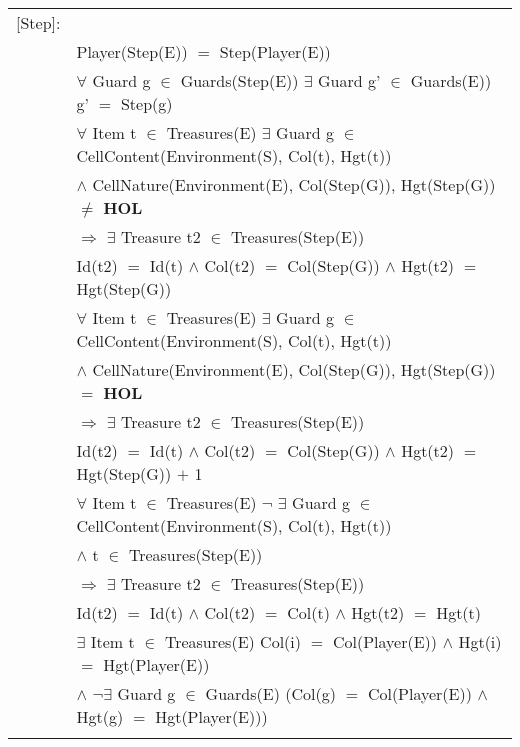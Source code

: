 \documentclass[8pt]{article}
\begin{document}
{\begin{longtable}{rl}
  \textrm{[Step]}:&\\
  & \textrm{Player(Step(E))} $=$ \textrm{Step(Player(E))}\\
  & $\forall$ \textrm{Guard} g $\in$ \textrm{Guards(Step(E))} $\exists$ \textrm{Guard} g' $\in$ \textrm{Guards(E))} g' $=$ \textrm{Step(g)}\\
  & $\forall$ \textrm{Item} t $\in$ \textrm{Treasures(E)} $\exists$ \textrm{Guard} g $\in$ \textrm{CellContent(Environment(S), Col(t), Hgt(t))}\\
  & \quad\quad $\land$ \textrm{CellNature(Environment(E), Col(Step(G)), Hgt(Step(G))} $\ne$ \textbf{HOL}\\
  & \quad\quad $\Rightarrow$ $\exists$ \textrm{Treasure} t2 $\in$ \textrm{Treasures(Step(E))}\\
  & \quad\quad\quad\quad \textrm{Id(t2)} $=$ \textrm{Id(t)} $\land$ \textrm{Col(t2)} $=$ \textrm{Col(Step(G))} $\land$ \textrm{Hgt(t2)} $=$ \textrm{Hgt(Step(G))}\\
  & $\forall$ \textrm{Item} t $\in$ \textrm{Treasures(E)} $\exists$ \textrm{Guard} g $\in$ \textrm{CellContent(Environment(S), Col(t), Hgt(t))}\\
  & \quad\quad $\land$ \textrm{CellNature(Environment(E), Col(Step(G)), Hgt(Step(G))} $=$ \textbf{HOL}\\
  & \quad\quad $\Rightarrow$ $\exists$ \textrm{Treasure} t2 $\in$ \textrm{Treasures(Step(E))}\\
  & \quad\quad\quad\quad \textrm{Id(t2)} $=$ \textrm{Id(t)} $\land$ \textrm{Col(t2)} $=$ \textrm{Col(Step(G))} $\land$ \textrm{Hgt(t2)} $=$ \textrm{Hgt(Step(G))} $+$ 1\\
  & $\forall$ \textrm{Item} t $\in$ \textrm{Treasures(E)} $\neg$ $\exists$ \textrm{Guard} g $\in$ \textrm{CellContent(Environment(S), Col(t), Hgt(t))}\\
  & \quad\quad $\land$ t $\in$ \textrm{Treasures(Step(E))} \\
  & \quad\quad $\Rightarrow$ $\exists$ \textrm{Treasure} t2 $\in$ \textrm{Treasures(Step(E))}\\
  & \quad\quad\quad\quad \textrm{Id(t2)} $=$ \textrm{Id(t)} $\land$ \textrm{Col(t2)} $=$ \textrm{Col(t)} $\land$ \textrm{Hgt(t2)} $=$ \textrm{Hgt(t)}\\
  & $\exists$ \textrm{Item} t $\in$ \textrm{Treasures(E)} \textrm{Col(i)} $=$ \textrm{Col(Player(E))} $\land$ \textrm{Hgt(i)} $=$ \textrm{Hgt(Player(E))}\\
  & \quad\quad $\land$ $\neg$$\exists$ \textrm{Guard} g $\in$ \textrm{Guards(E)} (\textrm{Col(g)} $=$ \textrm{Col(Player(E))} $\land$ \textrm{Hgt(g)} $=$ \textrm{Hgt(Player(E))})\\
$$
\end{longtable}}
\end{document}
